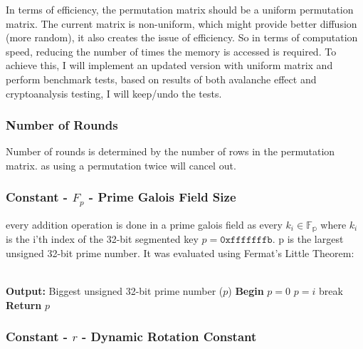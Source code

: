 \documentclass[fleqn, a4paper,12pt]{article}
\begin{document}
In terms of efficiency, the permutation matrix should be a uniform permutation matrix. The current matrix is non-uniform, which might provide better diffusion (more random), it also creates the issue of efficiency. So in terms of computation speed, reducing the number of times the memory is accessed is required. To achieve this, I will implement an updated version with uniform matrix and perform benchmark tests, based on results of both avalanche effect and cryptoanalysis testing, I will keep/undo the tests.

\subsubsection{Number of Rounds}

Number of rounds is determined by the number of rows in the permutation matrix. as using a permutation twice will cancel out.

\subsubsection{Constant - $F_p$ - Prime Galois Field Size}

every addition operation is done in a prime galois field as every $k_i \in \mathbb{F_p}$ where $k_i$ is the i'th index of the 32-bit segmented key $p = \texttt{0xfffffffb}$. p is the largest unsigned 32-bit prime number. It was evaluated using Fermat's Little Theorem:\\
\\
\begin{algorithm}[H] %
\caption{Find the largest 32-bit prime number pseudo-code}
\begin{algorithmic}[1]  %
\State \textbf{Output:} Biggest unsigned 32-bit prime number ($p$)
\State \textbf{Begin}
\State $p = 0$
		\State $p = i$
		\State break
	\EndIf
\EndFor
\State \textbf{Return} $p$
\end{algorithmic}
\end{algorithm}

\subsubsection{Constant - $r$ - Dynamic Rotation Constant} \label{rotation_constant}
\end{document}
